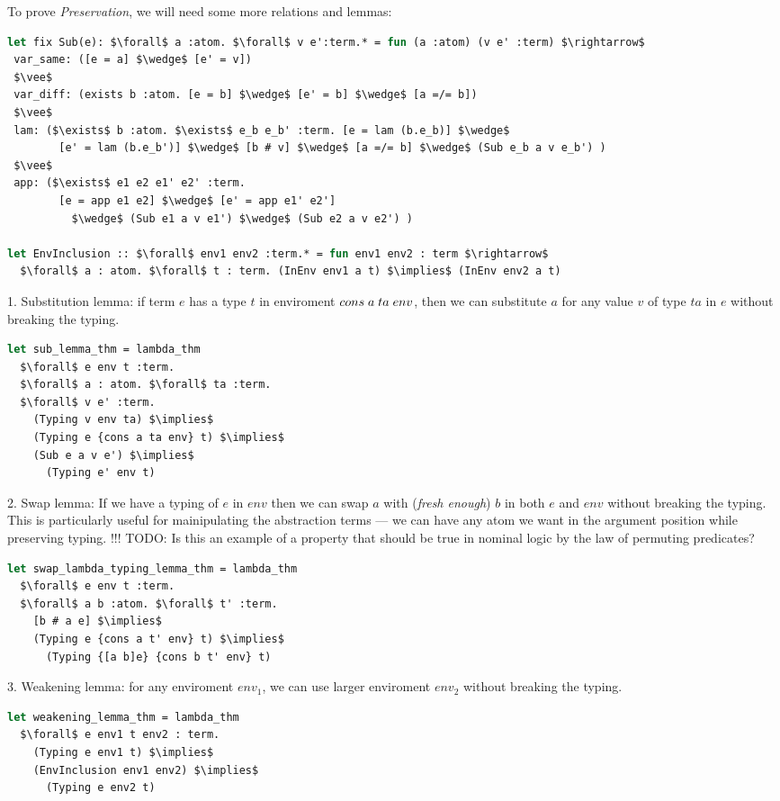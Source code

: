 \documentclass[english, mgr]{iithesis}
\begin{document}
\pagebreak
To prove \textit{Preservation}, we will need some more relations and lemmas:
\begin{lstlisting}[mathescape, language=OCaml]
let fix Sub(e): $\forall$ a :atom. $\forall$ v e':term.* = fun (a :atom) (v e' :term) $\rightarrow$
 var_same: ([e = a] $\wedge$ [e' = v])
 $\vee$
 var_diff: (exists b :atom. [e = b] $\wedge$ [e' = b] $\wedge$ [a =/= b])
 $\vee$
 lam: ($\exists$ b :atom. $\exists$ e_b e_b' :term. [e = lam (b.e_b)] $\wedge$
        [e' = lam (b.e_b')] $\wedge$ [b # v] $\wedge$ [a =/= b] $\wedge$ (Sub e_b a v e_b') )
 $\vee$
 app: ($\exists$ e1 e2 e1' e2' :term.
        [e = app e1 e2] $\wedge$ [e' = app e1' e2']
          $\wedge$ (Sub e1 a v e1') $\wedge$ (Sub e2 a v e2') )

let EnvInclusion :: $\forall$ env1 env2 :term.* = fun env1 env2 : term $\rightarrow$
  $\forall$ a : atom. $\forall$ t : term. (InEnv env1 a t) $\implies$ (InEnv env2 a t)
\end{lstlisting}

1. Substitution lemma:
if term $e$ has a type $t$ in enviroment ${cons}\;a\;ta\;env$,
then we can substitute $a$ for any value $v$ of type $ta$ in $e$ without breaking the typing.
\begin{lstlisting}[mathescape,language=OCaml]
let sub_lemma_thm = lambda_thm
  $\forall$ e env t :term.
  $\forall$ a : atom. $\forall$ ta :term.
  $\forall$ v e' :term.
    (Typing v env ta) $\implies$
    (Typing e {cons a ta env} t) $\implies$
    (Sub e a v e') $\implies$
      (Typing e' env t)
\end{lstlisting}

2. Swap lemma:
If we have a typing of $e$ in $env$ then we can
swap $a$ with (\textit{fresh enough}) $b$ in both $e$ and $env$ without breaking the typing.
This is particularly useful for mainipulating the abstraction terms ---
we can have any atom we want in the argument position while preserving typing.
!!! TODO: Is this an example of a property that should be true in nominal logic
by the law of permuting predicates?
\begin{lstlisting}[mathescape,language=OCaml]
let swap_lambda_typing_lemma_thm = lambda_thm
  $\forall$ e env t :term.
  $\forall$ a b :atom. $\forall$ t' :term.
    [b # a e] $\implies$
    (Typing e {cons a t' env} t) $\implies$
      (Typing {[a b]e} {cons b t' env} t)
\end{lstlisting}

3. Weakening lemma: for any enviroment $env_1$, we can use larger enviroment $env_2$ without breaking the typing.
\begin{lstlisting}[mathescape,language=OCaml]
let weakening_lemma_thm = lambda_thm
  $\forall$ e env1 t env2 : term.
    (Typing e env1 t) $\implies$
    (EnvInclusion env1 env2) $\implies$
      (Typing e env2 t)
\end{lstlisting}
\end{document}
